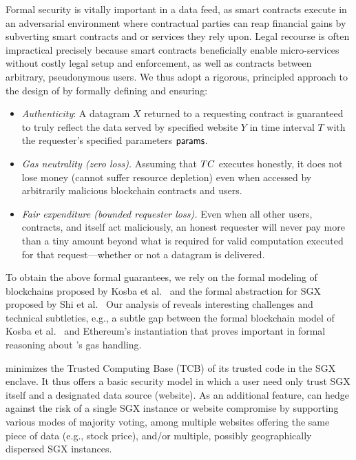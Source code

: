\vspace{2mm}
Formal security is vitally important in a data feed, as  smart contracts execute in an adversarial environment
where contractual parties can reap financial gains by subverting smart contracts and or services they rely upon.
Legal recourse is often impractical precisely because smart contracts beneficially enable micro-services without costly legal setup and enforcement, as well as contracts between arbitrary, pseudonymous users. We thus adopt a rigorous, principled approach to the design of \tcs by formally defining and ensuring: 

\vspace{-1mm}
\begin{itemize}[leftmargin=5mm]
\item
  \setlength{\itemsep}{2pt}
  \setlength{\parskip}{0pt}
  \setlength{\parsep}{0pt}
{\it Authenticity}: A datagram $X$ returned
to a requesting contract is guaranteed
to truly reflect the data served by specified website $Y$ in time interval $T$ with the requester's specified parameters ${\sf params}$.
\item
{\it Gas neutrality (zero \tc loss).} Assuming that $TC$ executes honestly, it does not lose money (cannot suffer resource depletion)
even when accessed by arbitrarily malicious blockchain contracts and users.
\item
{\it Fair expenditure (bounded requester loss).} 
Even when all other users, contracts, and \tc itself act maliciously, 
an honest requester will never pay more than a tiny amount beyond what is required for valid computation executed for that request---whether or not a datagram is delivered.
\end{itemize}
\vspace{-1mm}

To obtain the above formal guarantees,
we rely on the formal modeling 
of blockchains proposed by Kosba et al.~\cite{hawk} and the formal abstraction for SGX proposed by Shi et al.~\cite{sgxsok}
Our analysis of \tc reveals interesting challenges and technical subtleties, e.g., 
a subtle gap between the formal blockchain model
of Kosba et al.~\cite{hawk}
and Ethereum's instantiation  
that proves important in formal reasoning about \tc's
gas handling. 

\vspace{2mm}
\tc minimizes the Trusted Computing Base (TCB) of its trusted code in the SGX enclave.
It thus offers a basic security model in which a user need only trust SGX itself and a designated data source (website).
As an additional feature, \tc can hedge against the risk of a single SGX instance
or website compromise by supporting
various modes of majority voting, 
among multiple 
websites offering the same piece of data (e.g., stock price),  
and/or multiple, possibly geographically dispersed SGX instances.

